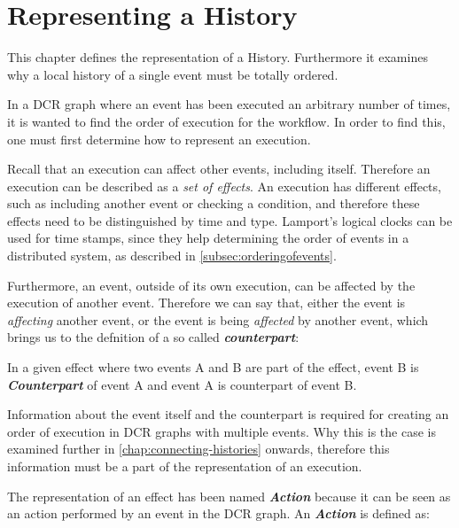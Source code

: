 \chapter{Representing a History}\label{chap:representing-a-history}
	This chapter defines the representation of a History. Furthermore it examines why a local history of a single event must be totally ordered.
	
	\newpar	In a DCR graph where an event has been executed an arbitrary number of times, it is wanted to find the order of execution for the workflow. In order to find this, one must first determine how to represent an execution.
	
	\newpar Recall that an execution can affect other events, including itself. Therefore an execution can be described as a \textit{set of effects}. An execution has different effects, such as including another event or checking a condition, and therefore these effects need to be distinguished by time and type. Lamport's logical clocks can be used for time stamps, since they help determining the order of events in a distributed system, as described in \autoref{subsec:orderingofevents}. 
	
	Furthermore, an event, outside of its own execution, can be affected by the execution of another event. Therefore we can say that, either the event is \textit{affecting} another event, or the event is being \textit{affected} by another event, which brings us to the defnition of a so called \textit{\textbf{counterpart}}:
	

	\begin{definition}
		In a given effect where two events A and B are part of the effect, event B is \textbf{\textit{Counterpart}} of event A and event A is counterpart of event B.
	\end{definition}
	
	\newpar Information about the event itself and the counterpart is required for creating an order of execution in DCR graphs with multiple events. Why this is the case is examined further in \autoref{chap:connecting-histories} onwards, therefore this information must be a part of the representation of an execution.
	
	\newpar The representation of an effect has been named \textit{\textbf{Action}} because it can be seen as an action performed by an event in the DCR graph. An \textit{\textbf{Action}} is defined as:
	
